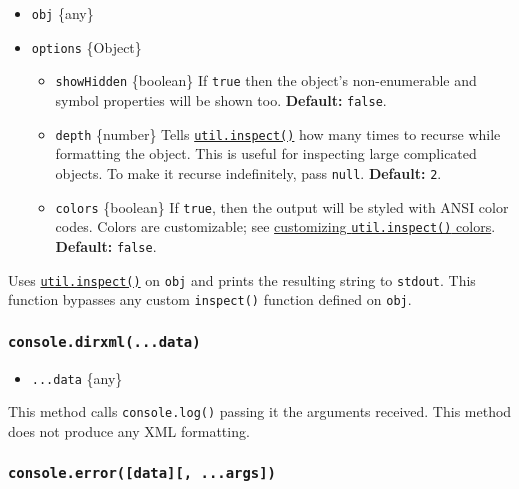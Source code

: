 \begin{itemize}
\tightlist
\item
  \texttt{obj} \{any\}
\item
  \texttt{options} \{Object\}

  \begin{itemize}
  \tightlist
  \item
    \texttt{showHidden} \{boolean\} If \texttt{true} then the object's
    non-enumerable and symbol properties will be shown too.
    \textbf{Default:} \texttt{false}.
  \item
    \texttt{depth} \{number\} Tells
    \href{util.md\#utilinspectobject-options}{\texttt{util.inspect()}}
    how many times to recurse while formatting the object. This is
    useful for inspecting large complicated objects. To make it recurse
    indefinitely, pass \texttt{null}. \textbf{Default:} \texttt{2}.
  \item
    \texttt{colors} \{boolean\} If \texttt{true}, then the output will
    be styled with ANSI color codes. Colors are customizable; see
    \href{util.md\#customizing-utilinspect-colors}{customizing
    \texttt{util.inspect()} colors}. \textbf{Default:} \texttt{false}.
  \end{itemize}
\end{itemize}

Uses \href{util.md\#utilinspectobject-options}{\texttt{util.inspect()}}
on \texttt{obj} and prints the resulting string to \texttt{stdout}. This
function bypasses any custom \texttt{inspect()} function defined on
\texttt{obj}.

\subsubsection{\texorpdfstring{\texttt{console.dirxml(...data)}}{console.dirxml(...data)}}\label{console.dirxml...data}

\begin{itemize}
\tightlist
\item
  \texttt{...data} \{any\}
\end{itemize}

This method calls \texttt{console.log()} passing it the arguments
received. This method does not produce any XML formatting.

\subsubsection{\texorpdfstring{\texttt{console.error({[}data{]}{[},\ ...args{]})}}{console.error({[}data{]}{[}, ...args{]})}}\label{console.errordata-...args}

